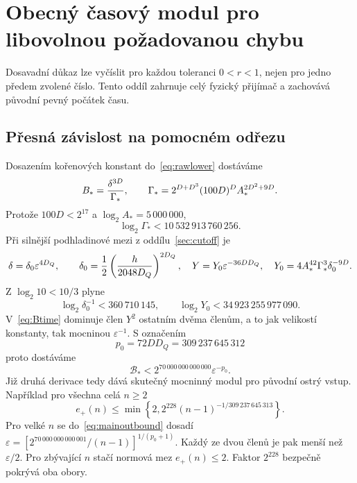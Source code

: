 \documentclass[11pt,a4paper]{article}
\theoremstyle{remark}\newtheorem{remark}[theorem]{Poznámka}
\numberwithin{equation}{section}
\begin{document}
\section{Obecný časový modul pro libovolnou požadovanou chybu}
\label{sec:generalmodulus}

Dosavadní důkaz lze vyčíslit pro každou toleranci \(0<r<1\), nejen pro jedno předem zvolené číslo. Tento oddíl zahrnuje celý fyzický přijímač a zachovává původní pevný počátek času.

\subsection{Přesná závislost na pomocném odřezu}

Dosazením kořenových konstant do~\eqref{eq:rawlower} dostáváme
\begin{equation}
B_*={\delta^{3D}\over\Gamma_*},\qquad
\Gamma_*=2^{D+D^3}(100D)^D A_*^{2D^2+9D}.
\label{eq:Gammaexact}
\end{equation}
Protože \(100D<2^{17}\) a \(\log_2A_*=5\,000\,000\),
\begin{equation}
\log_2\Gamma_*<10\,532\,913\,760\,256.
\label{eq:Gammaheight}
\end{equation}
Při silnější podhladinové mezi z oddílu~\ref{sec:cutoff} je
\[
\delta=\delta_0\varepsilon^{4D_Q},\qquad
\delta_0={1\over2}\left({h\over2048D_Q}\right)^{2D_Q},
\quad
Y=Y_0\varepsilon^{-36DD_Q},
\quad
Y_0=4A_*^{42}\Gamma_*^3\delta_0^{-9D}.
\]
Z \(\log_2 10<10/3\) plyne
\[
\log_2\delta_0^{-1}<360\,710\,145,\qquad
\log_2Y_0<34\,923\,255\,977\,090.
\]
V~\eqref{eq:Btime} dominuje člen \(Y^2\) ostatním dvěma členům, a to jak velikostí konstanty, tak mocninou \(\varepsilon^{-1}\). S označením
\[
p_0=72DD_Q=309\,237\,645\,312
\]
proto dostáváme
\begin{equation}
\mathcal B_*<2^{70\,000\,000\,000\,000}\varepsilon^{-p_0}.
\label{eq:Btimegeneral}
\end{equation}
Již druhá derivace tedy dává skutečný mocninný modul pro původní ostrý vstup. Například pro všechna celá \(n\ge2\)
\begin{equation}
e_+(n)\le\min\left\{2,
2^{228}(n-1)^{-1/309\,237\,645\,313}\right\}.
\label{eq:baregeneral}
\end{equation}
Pro velké \(n\) se do~\eqref{eq:mainoutbound} dosadí
\(\varepsilon=[2^{70\,000\,000\,000\,001}/(n-1)]^{1/(p_0+1)}\).
Každý ze dvou členů je pak menší než \(\varepsilon/2\). Pro zbývající \(n\) stačí normová mez \(e_+(n)\le2\). Faktor \(2^{228}\) bezpečně pokrývá oba obory.
\end{document}
